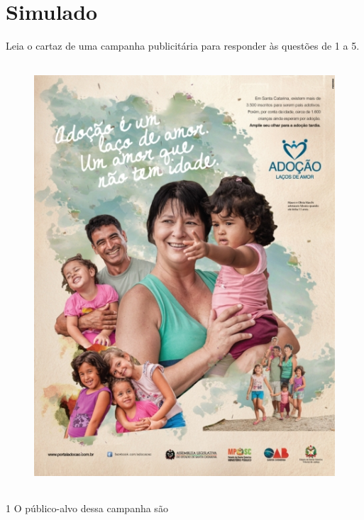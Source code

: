 \setcounter{chapter}{0}
\chapter[Simulado 1]{Simulado}

Leia o cartaz de uma campanha publicitária para responder às questões de
1 a 5.


\begin{figure}[htpb!]
\centering
\includegraphics[width=4.68750in,height=6.25000in]{./_SAEB_9_POR/media/image33.jpeg}
\end{figure}


\num{1} O público-alvo dessa campanha são


